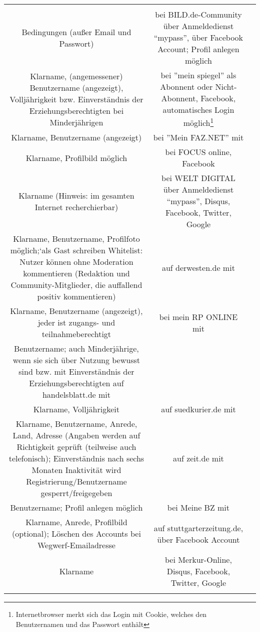 \begin{landscape}
\begin{tabular}{ccc}
{		
Registrierung/Anmeldung/Login  \\
Bedingungen (außer Email und Passwort)
 &		%
		bei BILD.de-Community über Anmeldedienst ``mypass'', über Facebook Account; Profil anlegen möglich\\
		Klarname, (angemessener) Benutzername (angezeigt), Volljährigkeit bzw. Einverständnis der Erziehungsberechtigten bei Minderjährigen
		&
		bei ''mein spiegel'' als Abonnent oder Nicht-Abonnent, Facebook, automatisches Login möglich\footnote{Internetbrowser merkt sich das Login mit Cookie, welches den Benutzernamen und das Passwort enthält} \\
		Klarname, Benutzername (angezeigt)
		&
		bei ''Mein FAZ.NET'' mit\\
		Klarname, Profilbild möglich
		&
		bei FOCUS online, Facebook\\
		Klarname (Hinweis: im gesamten Internet recherchierbar)
		&
		bei WELT DIGITAL über Anmeldedienst ``mypass'', Disqus, Facebook, Twitter, Google\\
		Klarname, Benutzername, Profilfoto möglich;`als Gast schreiben
		Whitelist: Nutzer können ohne Moderation kommentieren (Redaktion und Community-Mitglieder, die auffallend positiv 					kommentieren)
		&
		auf derwesten.de mit\\
		Klarname, Benutzername (angezeigt), jeder ist zugangs- und teilnahmeberechtigt
		&
		bei mein RP ONLINE mit\\
		Benutzername; auch Minderjährige, wenn sie sich über Nutzung bewusst sind bzw. mit Einverständnis der Erziehungsberechtigten
		auf handelsblatt.de mit\\
		Klarname, Volljährigkeit
		&
		auf suedkurier.de mit \\
		Klarname, Benutzername, Anrede, Land, Adresse (Angaben werden auf Richtigkeit geprüft (teilweise auch telefonisch); Einverständnis nach sechs Monaten Inaktivität wird Registrierung/Benutzername gesperrt/freigegeben
		&
		auf zeit.de mit\\
		Benutzername; Profil anlegen möglich
		&
		bei Meine BZ mit\\
		Klarname, Anrede, Profilbild (optional); Löschen des Accounts bei Wegwerf-Emailadresse
		&
		auf stuttgarterzeitung.de, über Facebook Account \\
		Klarname
		&
		bei Merkur-Online, Disqus, Facebook, Twitter, Google\\
}
\end{tabular}
\end{landscape}
